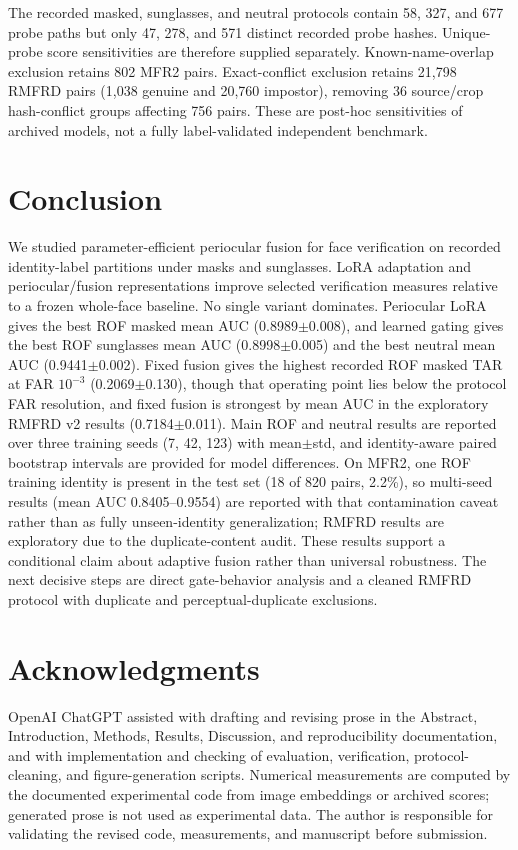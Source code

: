 \documentclass[10pt,journal,compsoc]{IEEEtran}
\begin{document}
The recorded masked, sunglasses, and neutral protocols contain 58, 327, and 677 probe paths but only 47, 278, and 571 distinct recorded probe hashes. Unique-probe score sensitivities are therefore supplied separately. Known-name-overlap exclusion retains 802 MFR2 pairs. Exact-conflict exclusion retains 21,798 RMFRD pairs (1,038 genuine and 20,760 impostor), removing 36 source/crop hash-conflict groups affecting 756 pairs. These are post-hoc sensitivities of archived models, not a fully label-validated independent benchmark.



\section{Conclusion}
We studied parameter-efficient periocular fusion for face verification on recorded identity-label partitions under masks and sunglasses. LoRA adaptation and periocular/fusion representations improve selected verification measures relative to a frozen whole-face baseline. No single variant dominates. Periocular LoRA gives the best ROF masked mean AUC (0.8989$\pm$0.008), and learned gating gives the best ROF sunglasses mean AUC (0.8998$\pm$0.005) and the best neutral mean AUC (0.9441$\pm$0.002). Fixed fusion gives the highest recorded ROF masked TAR at FAR $10^{-3}$ (0.2069$\pm$0.130), though that operating point lies below the protocol FAR resolution, and fixed fusion is strongest by mean AUC in the exploratory RMFRD v2 results (0.7184$\pm$0.011). Main ROF and neutral results are reported over three training seeds (7, 42, 123) with mean$\pm$std, and identity-aware paired bootstrap intervals are provided for model differences. On MFR2, one ROF training identity is present in the test set (18 of 820 pairs, 2.2\%), so multi-seed results (mean AUC 0.8405--0.9554) are reported with that contamination caveat rather than as fully unseen-identity generalization; RMFRD results are exploratory due to the duplicate-content audit. These results support a conditional claim about adaptive fusion rather than universal robustness. The next decisive steps are direct gate-behavior analysis and a cleaned RMFRD protocol with duplicate and perceptual-duplicate exclusions.

\section{Acknowledgments}
OpenAI ChatGPT assisted with drafting and revising prose in the Abstract, Introduction, Methods, Results, Discussion, and reproducibility documentation, and with implementation and checking of evaluation, verification, protocol-cleaning, and figure-generation scripts. Numerical measurements are computed by the documented experimental code from image embeddings or archived scores; generated prose is not used as experimental data. The author is responsible for validating the revised code, measurements, and manuscript before submission.
\end{document}
